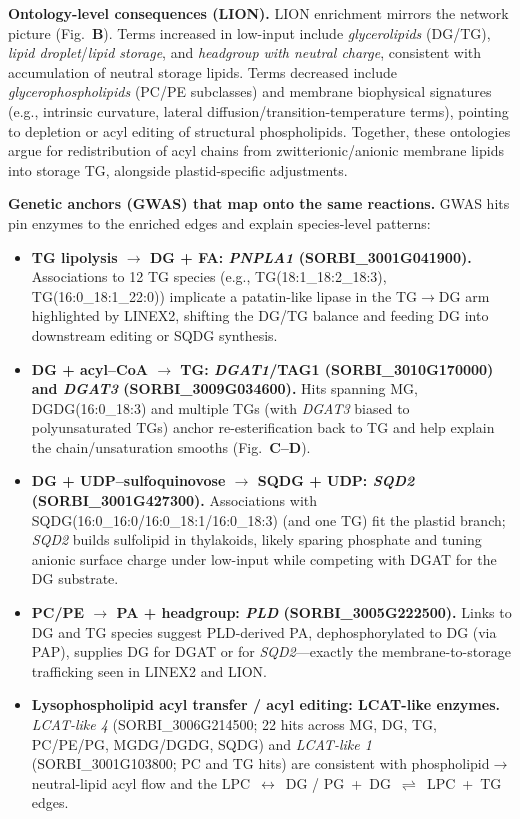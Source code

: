 \documentclass[10pt,letterpaper]{article}
\begin{document}
\noindent \textbf{Ontology-level consequences (LION).}
LION enrichment mirrors the network picture (Fig.\ \textbf{B}). Terms increased in low-input include \emph{glycerolipids} (DG/TG), \emph{lipid droplet}/\emph{lipid storage}, and \emph{headgroup with neutral charge}, consistent with accumulation of neutral storage lipids. Terms decreased include \emph{glycerophospholipids} (PC/PE subclasses) and membrane biophysical signatures (e.g., intrinsic curvature, lateral diffusion/transition-temperature terms), pointing to depletion or acyl editing of structural phospholipids. Together, these ontologies argue for redistribution of acyl chains from zwitterionic/anionic membrane lipids into storage TG, alongside plastid-specific adjustments.

\noindent \textbf{Genetic anchors (GWAS) that map onto the same reactions.}
GWAS hits pin enzymes to the enriched edges and explain species-level patterns:
\begin{itemize}\itemsep3pt
  \item \textbf{TG lipolysis $\rightarrow$ DG + FA: \textit{PNPLA1} (SORBI\_3001G041900).} Associations to 12 TG species (e.g., TG(18:1\_18:2\_18:3), TG(16:0\_18:1\_22:0)) implicate a patatin-like lipase in the TG$\rightarrow$DG arm highlighted by LINEX2, shifting the DG/TG balance and feeding DG into downstream editing or SQDG synthesis.
  \item \textbf{DG + acyl–CoA $\rightarrow$ TG: \textit{DGAT1}/TAG1 (SORBI\_3010G170000) and \textit{DGAT3} (SORBI\_3009G034600).} Hits spanning MG, DGDG(16:0\_18:3) and multiple TGs (with \textit{DGAT3} biased to polyunsaturated TGs) anchor re-esterification back to TG and help explain the chain/unsaturation smooths (Fig.\ \textbf{C–D}).
  \item \textbf{DG + UDP–sulfoquinovose $\rightarrow$ SQDG + UDP: \textit{SQD2} (SORBI\_3001G427300).} Associations with SQDG(16:0\_16:0/16:0\_18:1/16:0\_18:3) (and one TG) fit the plastid branch; \textit{SQD2} builds sulfolipid in thylakoids, likely sparing phosphate and tuning anionic surface charge under low-input while competing with DGAT for the DG substrate.
  \item \textbf{PC/PE $\rightarrow$ PA + headgroup: \textit{PLD} (SORBI\_3005G222500).} Links to DG and TG species suggest PLD-derived PA, dephosphorylated to DG (via PAP), supplies DG for DGAT or for \textit{SQD2}—exactly the membrane-to-storage trafficking seen in LINEX2 and LION.
  \item \textbf{Lysophospholipid acyl transfer / acyl editing: LCAT-like enzymes.} 
  \textit{LCAT-like 4} (SORBI\_3006G214500; 22 hits across MG, DG, TG, PC/PE/PG, MGDG/DGDG, SQDG) and \textit{LCAT-like 1} (SORBI\_3001G103800; PC and TG hits) are consistent with phospholipid$\rightarrow$neutral-lipid acyl flow and the \mbox{LPC $\leftrightarrow$ DG} / \mbox{PG + DG $\rightleftharpoons$ LPC + TG} edges.
\end{itemize}
\end{document}
